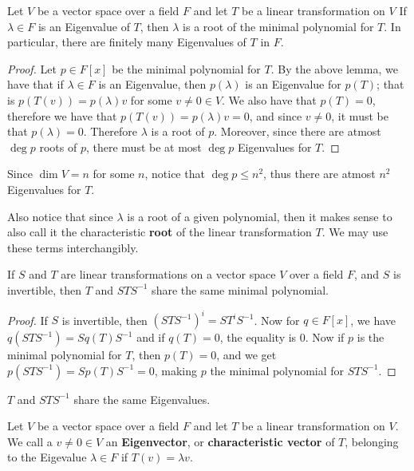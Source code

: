 \begin{theorem}\label{3.2.3}
    Let $V$ be a vector space over a field  $F$ and let  $T$ be a linear
    transformation on  $V$ If  $\lambda \in F$ is an Eigenvalue of  $T$, then
    $\lambda$ is a root of the minimal polynomial for  $T$. In particular, there
    are finitely many Eigenvalues of  $T$ in  $F$.
\end{theorem}
\begin{proof}
    Let $p \in F[x]$ be the minimal polynomial for $T$. By the above lemma, we
    have that if  $\lambda \in F$ is an Eigenvalue, then  $p(\lambda)$ is an
    Eigenvalue for $p(T)$; that is $p(T(v))=p(\lambda)v$ for some $v \neq 0 \in
    V$. We also have that $p(T)=0$, therefore  we have that
    $p(T(v))=p(\lambda)v=0$, and since $v \neq 0$, it must be that
    $p(\lambda)=0$. Therefore $\lambda$ is a root of $p$. Moreover, since there
    are atmost $\deg{p}$ roots of $p$, there must be at most  $\deg{p}$
    Eigenvalues for $T$.
\end{proof}
\begin{remark} 
    Since $\dim{V}=n$ for some $n$, notice that  $\deg{p} \leq n^2$, thus there
    are atmost $n^2$ Eigenvalues for $T$.
\end{remark}
\begin{remark} 
    Also notice that since $\lambda$ is a root of a given polynomial, then it
    makes sense to also call it the characteristic  \textbf{root} of the linear
    transformation $T$. We may use these terms interchangibly.
\end{remark}

\begin{lemma}\label{3.2.4}
    If $S$ and  $T$ are linear transformations on a vector space $V$ over a
    field  $F$, and $S$ is invertible, then $T$ and  $STS^{-1}$ share the same
    minimal polynomial.
\end{lemma}
\begin{proof}
    If $S$ is invertible, then $(STS^{-1})^i=ST^iS^{-1}$. Now for $q \in F[x]$,
    we have $q(STS^{-1})=Sq(T)S^{-1}$ and if $q(T)=0$, the equality is $0$. Now
    if  $p$ is the minimal polynomial for  $T$, then  $p(T)=0$, and we get
    $p(STS^{-1})=Sp(T)S^{-1}=0$, making $p$ the minimal polynomial for
    $STS^{-1}$.
\end{proof}
\begin{corollary}
    $T$ and  $STS^{-1}$ share the same Eigenvalues.
\end{corollary}

\begin{definition}
    Let $V$ be a vector space over a field  $F$ and let  $T$ be a linear
    transformation on  $V$. We call a  $v \neq 0 \in V$ an
    \textbf{Eigenvector}, or \textbf{characteristic vector} of $T$, belonging to
    the Eigevalue  $\lambda \in F$ if  $T(v)=\lambda v$.
\end{definition}

